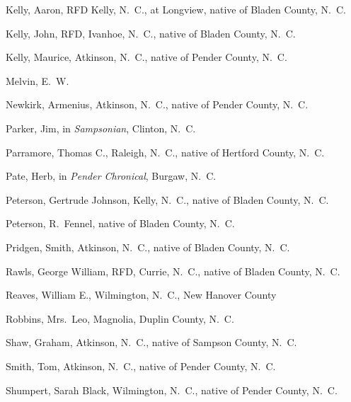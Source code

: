 \documentclass[11pt, a5paper, openright]{book}
\begin{document}
\begin{thebibliography}{99}
  Kelly, Aaron, RFD Kelly, N.~C., at Longview, native of Bladen County, N.~C.

  Kelly, John, RFD, Ivanhoe, N.~C., native of Bladen County, N.~C.

  Kelly, Maurice, Atkinson, N.~C., native of Pender County, N.~C.

  Melvin, E.~W.

  Newkirk, Armenius, Atkinson, N.~C., native of Pender County, N.~C.

  Parker, Jim, in \textit{Sampsonian}, Clinton, N.~C.

  Parramore, Thomas C., Raleigh, N.~C., native of Hertford County, N.~C.

  Pate, Herb, in \textit{Pender Chronical}, Burgaw, N.~C.

  Peterson, Gertrude Johnson, Kelly, N.~C., native of Bladen County, N.~C.

  Peterson, R.~Fennel, native of Bladen County, N.~C.

  Pridgen, Smith, Atkinson, N.~C., native of Bladen County, N.~C.

  Rawls, George William, RFD, Currie, N.~C., native of Bladen County, N.~C.

  Reaves, William E., Wilmington, N.~C., New Hanover County

  Robbins, Mrs.~Leo, Magnolia, Duplin County, N.~C.

  Shaw, Graham, Atkinson, N.~C., native of Sampson County, N.~C.

  Smith, Tom, Atkinson, N.~C., native of Pender County, N.~C.

  Shumpert, Sarah Black, Wilmington, N.~C., native of Pender County, N.~C.


\end{thebibliography}
\end{document}
